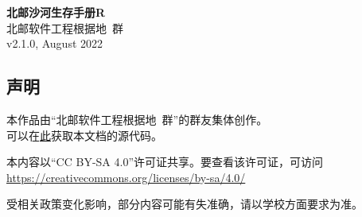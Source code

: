 \documentclass[a4paper]{article}
\begin{document}


\begin{titlepage}
    \centering
    {\Huge\rmfamily\bfseries 北邮沙河生存手册R} \\[6.5ex]
    {\Large\sffamily 北邮软件工程根据地\ 群} \\
    {\large\ttfamily v2.1.0, August 2022}\\[1.5ex]
\end{titlepage}

\begin{titlepage}
    \centering
    \section*{声明}

    本作品由“北邮软件工程根据地\ 群”的群友集体创作。\\
    可以在\href{https://github.com/BUPTSE/welcome}{此}获取本文档的源代码。

    \smallskip

    本内容以“CC BY-SA 4.0”许可证共享。要查看该许可证，可访问\\
    \href{https://creativecommons.org/licenses/by-sa/4.0/}{https://creativecommons.org/licenses/by-sa/4.0/}

    \smallskip

    受相关政策变化影响，部分内容可能有失准确，请以学校方面要求为准。

    \bigskip
    \tableofcontents
\end{titlepage}

\pagestyle{fancy}
\lhead{\small \leftmark}
\chead{}
\lfoot{}
\cfoot{\thepage}
\rfoot{}
\renewcommand{\headrulewidth}{0.4pt}



\newpage


\newpage


\newpage


\newpage


\newpage


\newpage


\newpage


\newpage


\newpage


\end{document}
